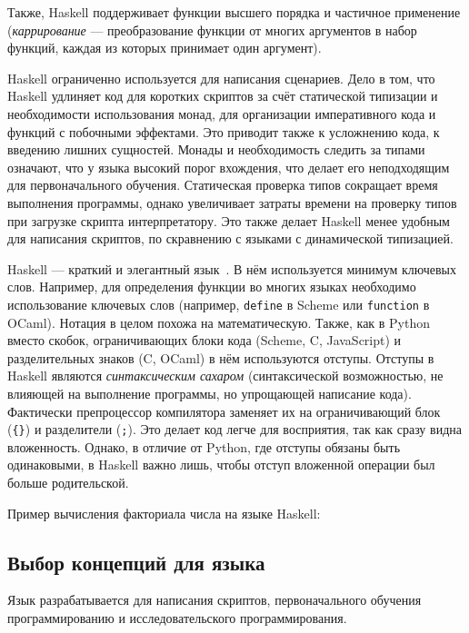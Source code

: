         Также, Haskell поддерживает функции высшего порядка и частичное применение (\textit{каррирование} --- преобразование функции от многих аргументов в набор функций, каждая из которых принимает один аргумент).

        Haskell ограниченно используется для написания сценариев.
        Дело в том, что Haskell удлиняет код для коротких скриптов за счёт статической типизации и необходимости использования монад, для организации императивного кода и функций с побочными эффектами.
        Это приводит также к усложнению кода, к введению лишних сущностей.
        Монады и необходимость следить за типами означают, что у языка высокий порог вхождения, что делает его неподходящим для первоначального обучения.
        Статическая проверка типов сокращает время выполнения программы, однако увеличивает затраты времени на проверку типов при загрузке скрипта интерпретатору.
        Это также делает Haskell менее удобным для написания скриптов, по скравнению с языками с динамической типизацией.

        Haskell --- краткий и элегантный язык~\cite{haskell}.
        В нём используется минимум ключевых слов.
        Например, для определения функции во многих языках необходимо использование ключевых слов (например, \verb!define! в Scheme или \verb!function! в OCaml).
        Нотация в целом похожа на математическую.
        Также, как в Python вместо скобок, ограничивающих блоки кода (Scheme, C, JavaScript) и разделительных знаков (C, OCaml) в нём используются отступы.
        Отступы в Haskell являются \textit{синтаксическим сахаром} (синтаксической возможностью, не влияющей на выполнение программы, но упрощающей написание кода).
        Фактически препроцессор компилятора заменяет их на ограничивающий блок (\verb${}$) и разделители (\verb$;$).
        Это делает код легче для восприятия, так как сразу видна вложенность.
        Однако, в отличие от Python, где отступы обязаны быть одинаковыми, в Haskell важно лишь, чтобы отступ вложенной операции был больше родительской.

        Пример вычисления факториала числа на языке Haskell:

        

    \subsection{Выбор концепций для языка}
        Язык разрабатывается для написания скриптов, первоначального обучения программированию и исследовательского программирования.

